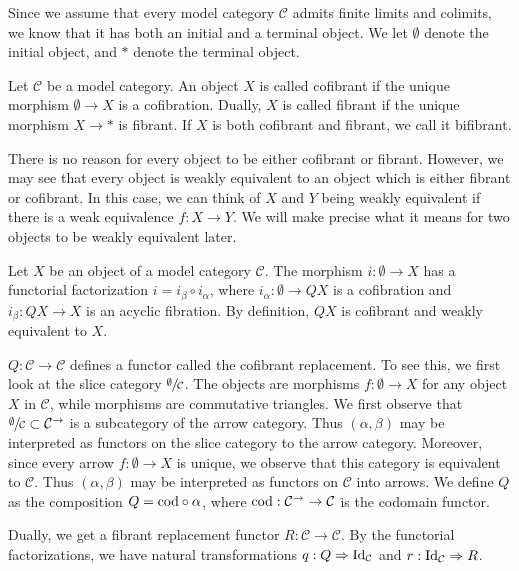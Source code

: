 \documentclass[../thesis.tex]{subfiles}
\begin{document}
            Since we assume that every model category $\mathcal{C}$ admits finite limits and colimits, we know that it has both an initial and a terminal object. We let $\emptyset$ denote the initial object, and $*$ denote the terminal object. 

            \begin{definition}
                Let $\mathcal{C}$ be a model category. An object $X$ is called cofibrant if the unique morphism $\emptyset \rightarrow X$ is a cofibration. Dually, $X$ is called fibrant if the unique morphism $X \rightarrow *$ is fibrant. If $X$ is both cofibrant and fibrant, we call it bifibrant.
            \end{definition}

            There is no reason for every object to be either cofibrant or fibrant. However, we may see that every object is weakly equivalent to an object which is either fibrant or cofibrant. In this case, we can think of $X$ and $Y$ being weakly equivalent if there is a weak equivalence $f: X \rightarrow Y$. We will make precise what it means for two objects to be weakly equivalent later.

            \begin{construction}
                Let $X$ be an object of a model category $\mathcal{C}$. The morphism $i:\emptyset\rightarrow X$ has a functorial factorization $i=i_\beta\circ i_\alpha$, where $i_\alpha: \emptyset\rightarrow QX$ is a cofibration and $i_\beta: QX\rightarrow X$ is an acyclic fibration. By definition, $QX$ is cofibrant and weakly equivalent to $X$.

                $Q: \mathcal{C}\rightarrow \mathcal{C}$ defines a functor called the cofibrant replacement. To see this, we first look at the slice category $\sfrac{\emptyset}{\mathcal{C}}$. The objects are morphisms $f:\emptyset \rightarrow X$ for any object $X$ in $\mathcal{C}$, while morphisms are commutative triangles. We first observe that $\sfrac{\emptyset}{\mathcal{C}}\subset\mathcal{C}^\rightarrow$ is a subcategory of the arrow category. Thus $(\alpha, \beta)$ may be interpreted as functors on the slice category to the arrow category. Moreover, since every arrow $f:\emptyset \rightarrow X$ is unique, we observe that this category is equivalent to $\mathcal{C}$. Thus $(\alpha, \beta)$ may be interpreted as functors on $\mathcal{C}$ into arrows. We define $Q$ as the composition $Q = \tt{cod} \circ \alpha$, where $\tt{cod} : \mathcal{C}^{\rightarrow} \rightarrow \mathcal{C}$ is the codomain functor.

                Dually, we get a fibrant replacement functor $R: \mathcal{C} \rightarrow \mathcal{C}$. By the functorial factorizations, we have natural transformations $q : Q \Rightarrow \tt{Id}_\mathcal{C}$ and $r : \tt{Id}_\mathcal{C} \Rightarrow R$.
            \end{construction}
\end{document}
